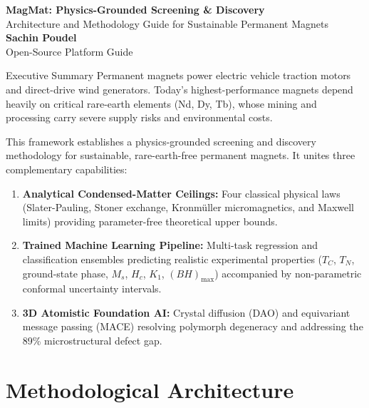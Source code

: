 \documentclass[10.5pt,a4paper]{article}
\begin{document}
\begin{center}
  {\LARGE\sffamily\bfseries\color{navyblue} MagMat: Physics-Grounded Screening \& Discovery}\\[0.3em]
  {\large\sffamily\color{darkslate} Architecture and Methodology Guide for Sustainable Permanent Magnets}\\[0.4em]
  {\normalsize\sffamily\bfseries Sachin Poudel}\\[0.2em]
  {\small\sffamily\color{gray} Open-Source Platform Guide}
\end{center}
\vspace{0.4em}

\begin{infobox}{Executive Summary}
\small
Permanent magnets power electric vehicle traction motors and direct-drive wind generators. Today's highest-performance magnets depend heavily on critical rare-earth elements (Nd, Dy, Tb), whose mining and processing carry severe supply risks and environmental costs.

This framework establishes a physics-grounded screening and discovery methodology for sustainable, rare-earth-free permanent magnets. It unites three complementary capabilities:
\begin{enumerate}[leftmargin=*]
  \item \textbf{Analytical Condensed-Matter Ceilings:} Four classical physical laws (Slater-Pauling, Stoner exchange, Kronmüller micromagnetics, and Maxwell limits) providing parameter-free theoretical upper bounds.
  \item \textbf{Trained Machine Learning Pipeline:} Multi-task regression and classification ensembles predicting realistic experimental properties ($T_C$, $T_N$, ground-state phase, $M_s$, $H_c$, $K_1$, $(BH)_{\max}$) accompanied by non-parametric conformal uncertainty intervals.
  \item \textbf{3D Atomistic Foundation AI:} Crystal diffusion (DAO) and equivariant message passing (MACE) resolving polymorph degeneracy and addressing the 89\% microstructural defect gap.
\end{enumerate}
\end{infobox}

\section{Methodological Architecture}
\end{document}
